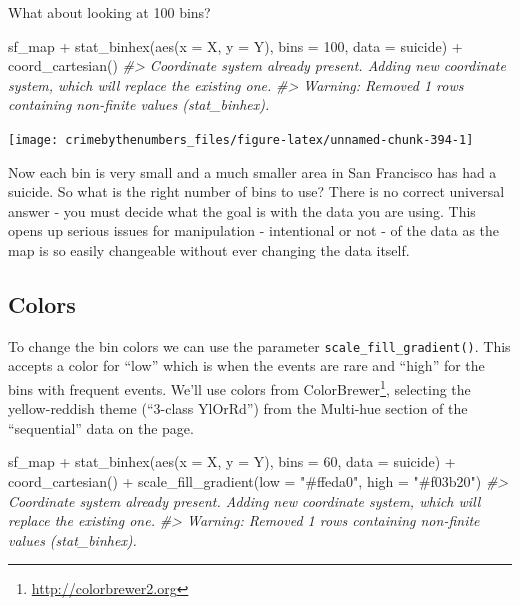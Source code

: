 \documentclass[
]{krantz}
\makeatletter
\newenvironment{Shaded}{\begin{snugshade}}{\end{snugshade}}
\newcommand{\AttributeTok}[1]{\textcolor[rgb]{0.61,0.61,0.61}{#1}}
\newcommand{\CommentTok}[1]{\textcolor[rgb]{0.37,0.37,0.37}{\textit{#1}}}
\newcommand{\DecValTok}[1]{\textcolor[rgb]{0.06,0.06,0.06}{#1}}
\newcommand{\FunctionTok}[1]{\textcolor[rgb]{0,0,0}{#1}}
\newcommand{\NormalTok}[1]{#1}
\newcommand{\SpecialCharTok}[1]{\textcolor[rgb]{0,0,0}{#1}}
\newcommand{\StringTok}[1]{\textcolor[rgb]{0.5,0.5,0.5}{#1}}
\renewcommand{\href}[2]{#2\footnote{\url{#1}}}
\newenvironment{kframe}{%
\medskip{}
\setlength{\fboxsep}{.8em}
 \def\at@end@of@kframe{}%
 \ifinner\ifhmode%
  \def\at@end@of@kframe{\end{minipage}}%
  \begin{minipage}{\columnwidth}%
 \fi\fi%
 \def\FrameCommand##1{\hskip\@totalleftmargin \hskip-\fboxsep
 \colorbox{shadecolor}{##1}\hskip-\fboxsep
     \hskip-\linewidth \hskip-\@totalleftmargin \hskip\columnwidth}%
 \MakeFramed {\advance\hsize-\width
   \@totalleftmargin\z@ \linewidth\hsize
   \@setminipage}}%
 {\par\unskip\endMakeFramed%
 \at@end@of@kframe}
\renewenvironment{Shaded}{\begin{kframe}}{\end{kframe}}
\makeatother
\begin{document}
What about looking at 100 bins?

\begin{Shaded}
\begin{Highlighting}[]
\NormalTok{sf\_map }\SpecialCharTok{+}
  \FunctionTok{stat\_binhex}\NormalTok{(}\FunctionTok{aes}\NormalTok{(}\AttributeTok{x =}\NormalTok{ X, }\AttributeTok{y =}\NormalTok{ Y),}
              \AttributeTok{bins =} \DecValTok{100}\NormalTok{,}
              \AttributeTok{data =}\NormalTok{ suicide) }\SpecialCharTok{+}
  \FunctionTok{coord\_cartesian}\NormalTok{() }
\CommentTok{\#\textgreater{} Coordinate system already present. Adding new coordinate system, which will replace the existing one.}
\CommentTok{\#\textgreater{} Warning: Removed 1 rows containing non{-}finite values (stat\_binhex).}
\end{Highlighting}
\end{Shaded}

\begin{center}\texttt{[image: crimebythenumbers\_files/figure-latex/unnamed-chunk-394-1]} \end{center}

Now each bin is very small and a much smaller area in San Francisco has had a suicide. So what is the right number of bins to use? There is no correct universal answer - you must decide what the goal is with the data you are using. This opens up serious issues for manipulation - intentional or not - of the data as the map is so easily changeable without ever changing the data itself.

\hypertarget{colors}{%
\subsection{Colors}\label{colors}}

To change the bin colors we can use the parameter \texttt{scale\_fill\_gradient()}. This accepts a color for ``low'' which is when the events are rare and ``high'' for the bins with frequent events. We'll use colors from \href{http://colorbrewer2.org}{ColorBrewer}, selecting the yellow-reddish theme (``3-class YlOrRd'') from the Multi-hue section of the ``sequential'' data on the page.

\begin{Shaded}
\begin{Highlighting}[]
\NormalTok{sf\_map }\SpecialCharTok{+}
  \FunctionTok{stat\_binhex}\NormalTok{(}\FunctionTok{aes}\NormalTok{(}\AttributeTok{x =}\NormalTok{ X, }\AttributeTok{y =}\NormalTok{ Y),}
              \AttributeTok{bins  =} \DecValTok{60}\NormalTok{,}
              \AttributeTok{data =}\NormalTok{ suicide) }\SpecialCharTok{+}
  \FunctionTok{coord\_cartesian}\NormalTok{() }\SpecialCharTok{+}
  \FunctionTok{scale\_fill\_gradient}\NormalTok{(}\AttributeTok{low =} \StringTok{"\#ffeda0"}\NormalTok{,}
                      \AttributeTok{high =} \StringTok{"\#f03b20"}\NormalTok{)}
\CommentTok{\#\textgreater{} Coordinate system already present. Adding new coordinate system, which will replace the existing one.}
\CommentTok{\#\textgreater{} Warning: Removed 1 rows containing non{-}finite values (stat\_binhex).}
\end{Highlighting}
\end{Shaded}
\end{document}
